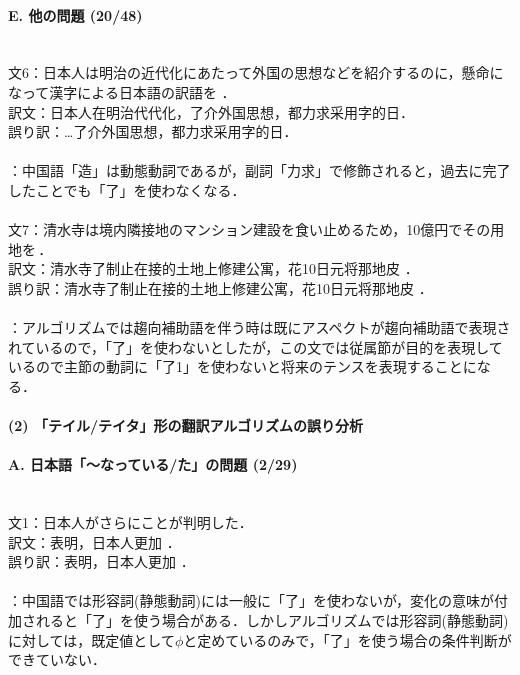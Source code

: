 \paragraph{E. 他の問題 (20/48)}　\\
文6：日本人は明治の近代化にあたって外国の思想などを紹介するのに，懸命になって漢字による日本語の訳語を ．\\
訳文：日本人在明治代代化，了介外国思想，都力求采用字的日．\\
誤り訳：…了介外国思想，都力求采用字的日．\\
\\
：中国語「造」は動態動詞であるが，副詞「力求」で修飾されると，過去に完了したことでも「了」を使わなくなる．\\
\\
文7：清水寺は境内隣接地のマンション建設を食い止めるため，10億円でその用地を\,．\\
訳文：清水寺了制止在接的土地上修建公寓，花10日元将那地皮 ．\\
誤り訳：清水寺了制止在接的土地上修建公寓，花10日元将那地皮 ．\\
\\
：アルゴリズムでは趨向補助語を伴う時は既にアスペクトが趨向補助語で表現されているので，「了」を使わないとしたが，この文では従属節が目的を表現しているので主節の動詞に「了1」を使わないと将来のテンスを表現することになる．

\paragraph{(2) 「テイル/テイタ」形の翻訳アルゴリズムの誤り分析}
\paragraph{A. 日本語「〜なっている/た」の問題 (2/29)}　\\
文1：日本人がさらにことが判明した．\\
訳文：表明，日本人更加 ．\\
誤り訳：表明，日本人更加 ．\\
\\
：中国語では形容詞(静態動詞)には一般に「了」を使わないが，変化の意味が付加されると「了」を使う場合がある．しかしアルゴリズムでは形容詞(静態動詞)に対しては，既定値として$\phi$と定めているのみで，「了」を使う場合の条件判断ができていない．


